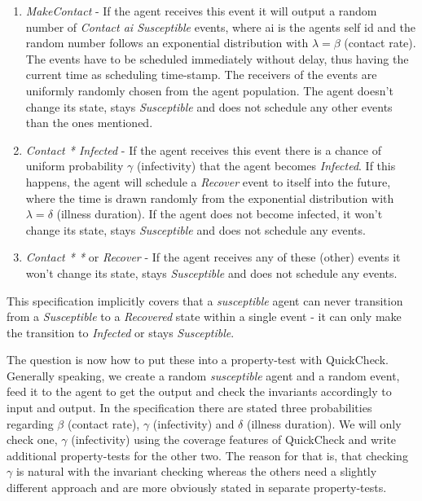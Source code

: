 \begin{enumerate}
	\item \textit{MakeContact} - If the agent receives this event it will output a random number of \textit{Contact ai Susceptible} events, where ai is the agents self id and the random number follows an exponential distribution with $\lambda = \beta$ (contact rate). The events have to be scheduled immediately without delay, thus having the current time as scheduling time-stamp. The receivers of the events are uniformly randomly chosen from the agent population. The agent doesn't change its state, stays \textit{Susceptible} and does not schedule any other events than the ones mentioned.
	
	\item \textit{Contact * Infected} - If the agent receives this event there is a chance of uniform probability $\gamma$ (infectivity) that the agent becomes \textit{Infected}. If this happens, the agent will schedule a \textit{Recover} event to itself into the future, where the time is drawn randomly from the exponential distribution with $\lambda = \delta$ (illness duration). If the agent does not become infected, it won't change its state, stays \textit{Susceptible} and does not schedule any events.
	
	\item \textit{Contact * *} or \textit{Recover}  - If the agent receives any of these (other) events it won't change its state, stays \textit{Susceptible} and does not schedule any events.
\end{enumerate}

This specification implicitly covers that a \textit{susceptible} agent can never transition from a \textit{Susceptible} to a \textit{Recovered} state within a single event - it can only make the transition to \textit{Infected} or stays \textit{Susceptible}.

The question is now how to put these into a property-test with QuickCheck. Generally speaking, we create a random \textit{susceptible} agent and a random event, feed it to the agent to get the output and check the invariants accordingly to input and output. In the specification there are stated three probabilities regarding $\beta$ (contact rate), $\gamma$ (infectivity) and $\delta$ (illness duration). We will only check one, $\gamma$ (infectivity) using the coverage features of QuickCheck and write additional property-tests for the other two. The reason for that is, that checking $\gamma$ is natural with the invariant checking whereas the others need a slightly different approach and are more obviously stated in separate property-tests.

